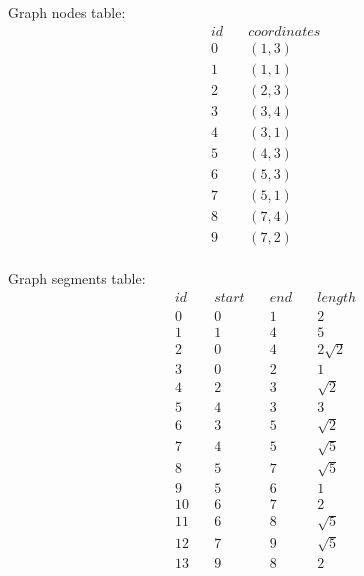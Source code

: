 \documentclass{article}
\begin{document}
	Graph nodes table:
	\begin{equation*}
		\begin{aligned}
			& id \quad & coordinates\\
			& 0 \quad & (1,3)\\
			& 1 \quad & (1,1)\\
			& 2 \quad & (2,3)\\
			& 3 \quad & (3,4)\\
			& 4 \quad & (3,1)\\
			& 5 \quad & (4,3)\\
			& 6 \quad & (5,3)\\
			& 7 \quad & (5,1)\\
			& 8 \quad & (7,4)\\
			& 9 \quad & (7,2)\\
		\end{aligned}
	\end{equation*}


	Graph segments table:
	\begin{equation*}
		\begin{aligned}
			& id \quad & start \quad & end \quad & length\\
			& 0 \quad & 0 \quad  & 1 \quad & 2\\
			& 1 \quad & 1 \quad & 4 \quad & 5\\
			& 2 \quad & 0 \quad & 4 \quad & 2\sqrt{2}\\
			& 3 \quad & 0 \quad & 2 \quad & 1\\
			& 4 \quad & 2 \quad & 3 \quad & \sqrt{2}\\
			& 5 \quad & 4 \quad & 3 \quad & 3\\
			& 6 \quad & 3 \quad & 5 \quad & \sqrt{2}\\
			& 7 \quad & 4 \quad & 5 \quad & \sqrt{5}\\
			& 8 \quad & 5 \quad & 7 \quad & \sqrt{5}\\
			& 9 \quad & 5 \quad & 6 \quad & 1\\
			& 10 \quad & 6 \quad & 7 \quad & 2\\
			& 11 \quad & 6 \quad & 8 \quad & \sqrt{5}\\
			& 12 \quad & 7 \quad & 9 \quad & \sqrt{5}\\
			& 13 \quad & 9 \quad & 8 \quad & 2\\
		\end{aligned}
	\end{equation*}
\end{document}

